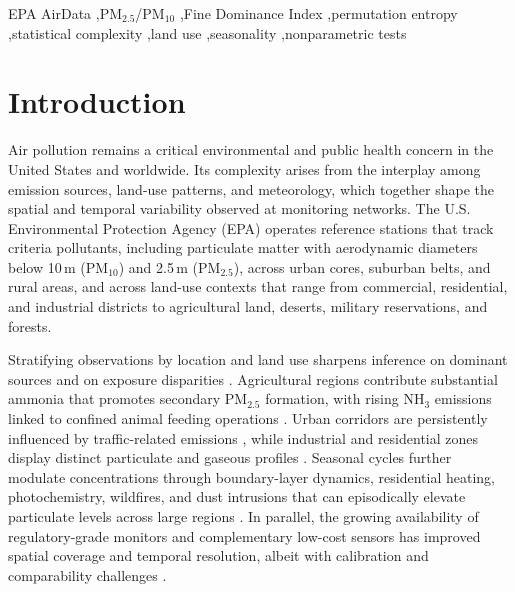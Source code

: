 \documentclass[a4paper,fleqn]{cas-sc}
\begin{document}
\begin{keywords}
EPA AirData \sep PM$_{2.5}$/PM$_{10}$ \sep Fine Dominance Index \sep permutation entropy \sep statistical complexity \sep land use \sep seasonality \sep nonparametric tests
\end{keywords}


\maketitle
\section{Introduction}
Air pollution remains a critical environmental and public health concern in the United States and worldwide. Its complexity arises from the interplay among emission sources, land-use patterns, and meteorology, which together shape the spatial and temporal variability observed at monitoring networks. The U.S. Environmental Protection Agency (EPA) operates reference stations that track criteria pollutants, including particulate matter with aerodynamic diameters below 10\,\textmu m (PM$_{10}$) and 2.5\,\textmu m (PM$_{2.5}$), across urban cores, suburban belts, and rural areas, and across land-use contexts that range from commercial, residential, and industrial districts to agricultural land, deserts, military reservations, and forests.

Stratifying observations by location and land use sharpens inference on dominant sources and on exposure disparities \citep{Kilpatrick2024, Hart2009, Sooktawee2020}. Agricultural regions contribute substantial ammonia that promotes secondary PM$_{2.5}$ formation, with rising NH$_3$ emissions linked to confined animal feeding operations \citep{Burns2023, Ogwu2024}. Urban corridors are persistently influenced by traffic-related emissions \citep{Alvarado-Molina2023, Nasr2025}, while industrial and residential zones display distinct particulate and gaseous profiles \citep{Bikis2023, Roy2023}. Seasonal cycles further modulate concentrations through boundary-layer dynamics, residential heating, photochemistry, wildfires, and dust intrusions that can episodically elevate particulate levels across large regions \citep{Achilleos2020, Velsquez-Garca2024, Rawat2024, Butler2024, Yu2021}. In parallel, the growing availability of regulatory-grade monitors and complementary low-cost sensors has improved spatial coverage and temporal resolution, albeit with calibration and comparability challenges \citep{Chen2022, Brilli2021}.
\end{document}
